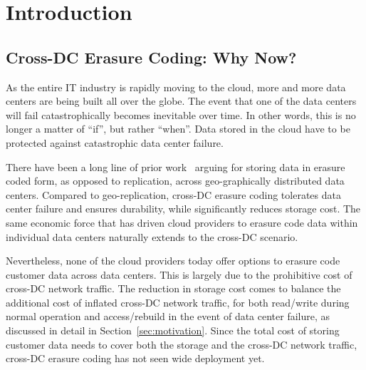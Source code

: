 \section{Introduction}

\subsection{Cross-DC Erasure Coding: Why Now?}

As the entire IT industry is rapidly moving to the cloud, more and more data
centers are being built all over the globe. The event that one of the data
centers will fail catastrophically becomes inevitable over time. In other words,
this is no longer a matter of ``if'', but rather ``when''. 
Data stored in the
cloud have to be protected against catastrophic data center failure.

There have been a long line of prior work~\cite{oceanstore:asplos00, pond:fast03,
weatherspoon2005long, hail:ccs09, racs:socc10, hu12nccloud} arguing for storing data
in erasure coded form, as opposed to replication, across geo-graphically
distributed data centers. Compared to geo-replication, cross-DC erasure coding
tolerates data center failure and ensures durability, while significantly
reduces storage cost. The same economic force that has driven cloud providers to
erasure code data within individual data centers naturally extends to the
cross-DC scenario.

Nevertheless, none of the cloud providers today offer options to erasure code
customer data across data centers. This is largely due to the prohibitive cost
of cross-DC network traffic. The reduction in storage cost comes to balance the
additional cost of inflated cross-DC network traffic, for both read/write during
normal operation and access/rebuild in the event of data center failure, as
discussed in detail in Section~\ref{sec:motivation}. Since the total cost of
storing customer data needs to cover both the storage and the cross-DC network
traffic, cross-DC erasure coding has not seen wide deployment yet.


